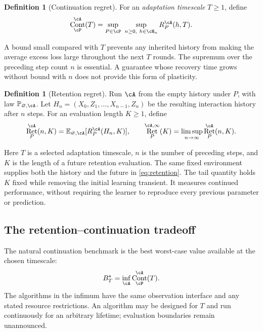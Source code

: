 \documentclass[11pt,twoside]{article}
\newcommand{\E}{\mathbb E}
\renewcommand{\P}{\mathbb P}
\theoremstyle{definition}
\newtheorem{definition}[theorem]{Definition}
\theoremstyle{remark}
\DeclareMathOperator{\Cont}{Cont}
\DeclareMathOperator{\Ret}{Ret}
\begin{document}
\begin{definition}[Continuation regret]
\label{def:continuation}
For an \emph{adaptation timescale} $T\ge1$, define
\begin{equation}
 \Cont_{\cP}^{\cA}(T)
 =\sup_{P\in\cP}\ \sup_{n\ge0,\ h\in\cH_n} R_P^\cA(h,T).
 \label{eq:continuation}
\end{equation}
\end{definition}

A bound small compared with $T$ prevents any inherited history from making
the average excess loss large throughout the next $T$ rounds. The supremum over
the preceding step count $n$ is essential. A guarantee whose recovery time grows
without bound with $n$ does not provide this form of plasticity.

\begin{definition}[Retention regret]
\label{def:retention}
Run $\cA$ from the empty history under $P$, with law $\P_{\varnothing,\cA}$.
Let $H_n=(X_0,Z_1,\ldots,X_{n-1},Z_n)$ be the resulting interaction
history after $n$ steps.
For an evaluation length $K\ge1$, define
\begin{equation}
 \Ret_P^\cA(n,K)=\E_{\varnothing,\cA}[R_P^\cA(H_n,K)],\qquad
 \Ret_P^{\cA,\infty}(K)=\limsup_{n\to\infty}\Ret_P^\cA(n,K).
 \label{eq:retention}
\end{equation}
\end{definition}

Here $T$ is a selected adaptation timescale, $n$ is the number of preceding steps,
and $K$ is the length of a future retention evaluation.
The same fixed environment supplies both the history and the future in
\cref{eq:retention}. The tail quantity holds $K$ fixed while removing the
initial learning transient. It measures continued performance, without
requiring the learner to reproduce every previous parameter or prediction.

\subsection{The retention--continuation tradeoff}
\label{sec:tradeoff}

The natural continuation benchmark is the best worst-case value available
at the chosen timescale:
\begin{equation}
 B_T^\star=\inf_{\cA}\Cont_{\cP}^{\cA}(T).
 \label{eq:minimax}
\end{equation}
The algorithms in the infimum have the same observation interface and any
stated resource restrictions. An algorithm may be designed for $T$ and run
continuously for an arbitrary lifetime; evaluation boundaries remain
unannounced.
\end{document}
